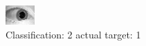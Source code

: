 \begin{figure}[h!]
\begin{center}
\includegraphics[width=0.60\columnwidth]{figures/ID1576_class_2_target_1.png}
\end{center}
\caption{ Classification: 2 actual target: 1}
\label{fig:ID1576_class_2_target_1}
\end{figure}

